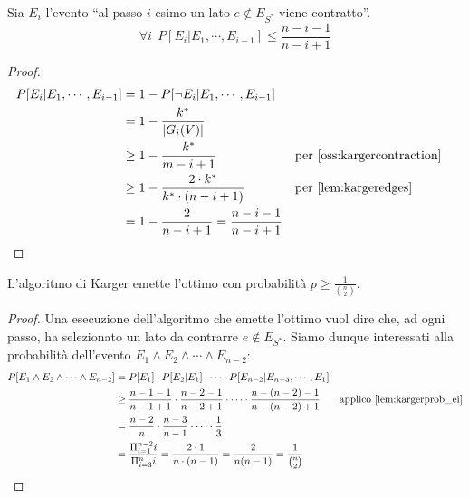 \begin{lemma}\label{lem:kargerprob_ei}
	Sia $E_i$ l'evento ``al passo $i$-esimo un lato $e \notin E_{S^*}$ viene contratto''.
	$$
		\forall i ~~ P[E_i | E_1, \cdots, E_{i-1}] \leq \frac{n-i-1}{n-i+1}
	$$
\end{lemma}
\begin{proof}
	\begin{align*}
		P[E_i | E_1, \cdots, E_{i -1}] & = 1 - P[\neg E_i | E_1, \cdots, E_{i -1}]           		\\
		 & = 1 - \frac{k^*}{|G_i(V)|}  																\\
		 & \geq 1 - \frac{k^*}{m - i + 1} && \text{per \cref{oss:kargercontraction}} 				\\
		 & \geq 1 - \frac{2 \cdot k^*}{k^* \cdot (n - i  + 1)} && \text{per \cref{lem:kargeredges}} \\
		 & = 1 - \frac{2}{n - i + 1} = \frac{n - i -  1}{n - i + 1}
	\end{align*}
\end{proof}

\begin{theorem}
	L'algoritmo di Karger emette l'ottimo con probabilità $p \geq \frac{1}{{n\choose{2}}}$.
\end{theorem}
\begin{proof}
	Una esecuzione dell'algoritmo che emette l'ottimo vuol dire che, ad ogni
	passo, ha selezionato un lato da contrarre $e \notin E_{S^*}$. Siamo dunque
	interessati alla probabilità dell'evento
	$E_1 \land E_2 \land \cdots \land E_{n-2}$:
	\begin{align*}
		P[E_1 \land E_2 \land \cdots \land E_{n-2}] & = P[E_1] \cdot P[E_2|E_1] \cdot \cdots \cdot P[E_{n-2}| E_{n-3}, \cdots, E_1] 				\\
		& \geq \frac{n-1-1}{n-1+1} \cdot \frac{n-2-1}{n-2+1} \cdot \cdots \cdot \frac{n-(n-2)-1}{n-(n-2)+1} & \text{applico \cref{lem:kargerprob_ei}}  \\
		& = \frac{n-2}{n} \cdot \frac{n-3}{n-1} \cdot \cdots \cdot \frac{1}{3}																		\\
		& = \frac{\Pi_{i = 1}^{n-2} i}{\Pi_{i = 3}^{n} i} = \frac{2 \cdot 1}{n \cdot (n-1)} = \frac{2}{n (n-1)} = \frac{1}{{n\choose{2}}}
	\end{align*}
\end{proof}

